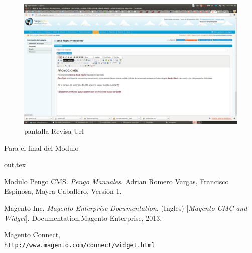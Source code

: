 \documentclass[12pt, letterpaper]{article}
\begin{document}
\begin{center}
\begin{figure}[htp]
\centering
\includegraphics[width=16cm]{widget00}
\caption{pantalla Revisa Url}
\label{fig:super}
\end{figure}
\end{center}



Para el final del Modulo 



{out.tex}


\begin{thebibliography}{9}
Modulo Pengo CMS. 
\textit{Pengo Manuales}. 
Adrian Romero Vargas, Francisco Espinosa, Mayra Caballero, Version 1.
 
Magento Inc. 
\textit{Magento Enterprise Documentation}. (Ingles) 
[\textit{Magento CMC and Widget}]. 
Documentation,Magento Enterprise, 2013.
 
Magento Connect,
\\\texttt{http://www.magento.com/connect/widget.html}
\end{thebibliography}
\end{document}
